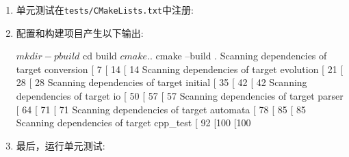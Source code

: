 \begin{enumerate}
\item 单元测试在\texttt{tests/CMakeLists.txt}中注册:


\item 配置和构建项目产生以下输出:

\begin{codebox}[shell]
$ mkdir -p build
$ cd build
$ cmake ..
$ cmake --build .
Scanning dependencies of target conversion
[ 7%
[ 14%
[ 14%
Scanning dependencies of target evolution
[ 21%
[ 28%
[ 28%
Scanning dependencies of target initial
[ 35%
[ 42%
[ 42%
Scanning dependencies of target io
[ 50%
[ 57%
[ 57%
Scanning dependencies of target parser
[ 64%
[ 71%
[ 71%
Scanning dependencies of target automata
[ 78%
[ 85%
[ 85%
Scanning dependencies of target cpp_test
[ 92%
[100%
[100%
\end{codebox}

\item 最后，运行单元测试:


\end{enumerate}


